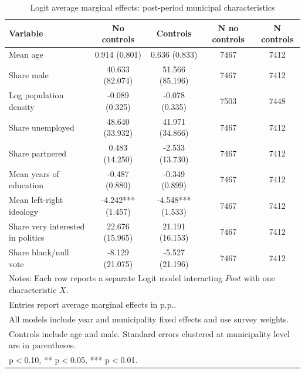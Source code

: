 \begin{table}[!htbp]
\centering
\caption{Logit average marginal effects: post-period municipal characteristics}
\label{tab:logit_post_x_mfx}
\small
\begin{tabular}{lcccc}
\hline
Variable & No controls & Controls & N no controls & N controls \\
\hline
Mean age & 0.914 (0.801) & 0.636 (0.833) & 7467 & 7412 \\
Share male & 40.633 (82.074) & 51.566 (85.196) & 7467 & 7412 \\
Log population density & -0.089 (0.325) & -0.078 (0.335) & 7503 & 7448 \\
Share unemployed & 48.640 (33.932) & 41.971 (34.866) & 7467 & 7412 \\
Share partnered & 0.483 (14.250) & -2.533 (13.730) & 7467 & 7412 \\
Mean years of education & -0.487 (0.880) & -0.349 (0.899) & 7467 & 7412 \\
Mean left-right ideology & -4.242*** (1.457) & -4.548*** (1.533) & 7467 & 7412 \\
Share very interested in politics & 22.676 (15.965) & 21.191 (16.153) & 7467 & 7412 \\
Share blank/null vote & -8.129 (21.075) & -5.527 (21.196) & 7467 & 7412 \\
\hline
\multicolumn{5}{l}{\footnotesize Notes: Each row reports a separate Logit model interacting $Post$ with one characteristic $X$.} \\
\multicolumn{5}{l}{\footnotesize Entries report average marginal effects in p.p..} \\
\multicolumn{5}{l}{\footnotesize All models include year and municipality fixed effects and use survey weights.} \\
\multicolumn{5}{l}{\footnotesize Controls include age and male. Standard errors clustered at municipality level are in parentheses.} \\
\multicolumn{5}{l}{\footnotesize * p$<$0.10, ** p$<$0.05, *** p$<$0.01.} \\
\end{tabular}
\end{table}
